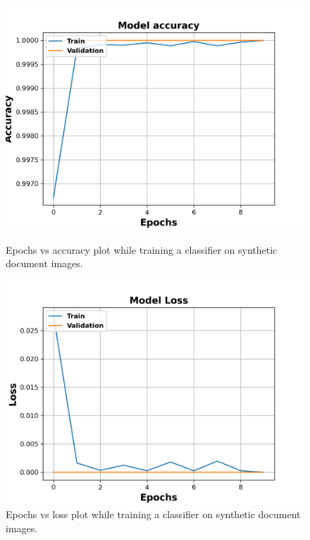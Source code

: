 \begin{figure}[H]
  \centering
  \begin{minipage}[b]{0.49\textwidth}
    \includegraphics[width=\textwidth]{images/Evaluation/Synthetic_Data_Classifier_2021-05-31_16-40-33_Accuracy.png}
    \caption[Epochs vs accuracy plot while training a classifier on synthetic document images.]{Epochs vs accuracy plot while training a classifier on synthetic document images.}
    \label{fig:SyntheticClassifierAcc}
  \end{minipage}
  \hfill
  \begin{minipage}[b]{0.49\textwidth}
    \includegraphics[width=\textwidth]{images/Evaluation/Synthetic_Data_Classifier_2021-05-31_16-40-33_Loss.png}
    \caption[Epochs vs loss plot while training a classifier on synthetic document images.]{Epochs vs loss plot while training a classifier on synthetic document images.}
    \label{fig:SyntheticClassifierLoss}
  \end{minipage}
\end{figure}


